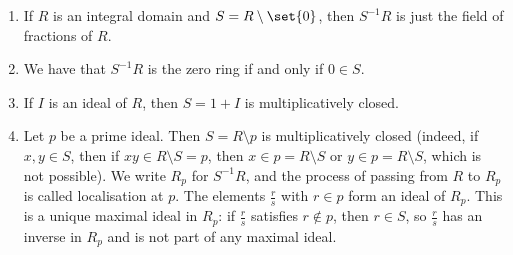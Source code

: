 \begin{enumerate}
	\item If $R$ is an integral domain and $S = R\setminus\set{0}$, then $S^{-1}R$
		is just the field of fractions of $R$.
	\item We have that $S^{-1}R$ is the zero ring if and only if $0 \in S$.
	\item If $I$ is an ideal of $R$, then $S = 1 + I$ is multiplicatively closed.
	\item Let $p$ be a prime ideal. Then $S = R\setminus p$ is multiplicatively closed
		(indeed, if $x, y \in S$, then if  $xy \in R \setminus S = p$, then
		 $x \in p = R \setminus S$ or $y \in p = R\setminus S$, which is not
		 possible). We write $R_p$ for $S^{-1}R$, and the process of passing
		 from $R$ to $R_p$ is called localisation at $p$. The elements $\frac{r}{s}$
		 with $r \in p$ form an ideal of $R_p$. This is a unique maximal ideal
		 in $R_p$: if $\frac{r}{s}$ satisfies $r\notin p$, then $r \in S$, so
		 $\frac{r}{s}$ has an inverse in $R_p$ and is not part of any maximal
		 ideal.
\end{enumerate}
